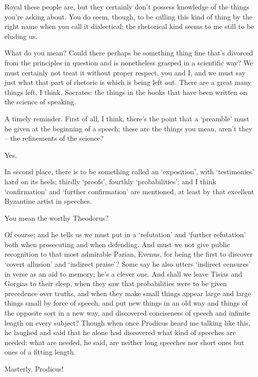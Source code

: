 Royal these people
are, but they certainly
don't possess knowledge of the things you're asking about. You do seem,
though, to be calling this kind of thing by the right name when you call
it dialectical; the rhetorical kind seems to me still to be eluding
us.

What do you mean? Could there perhaps be something 
thing fine that's divorced from the principles in question and is
nonetheless grasped in a scientific way? We must certainly not treat it
without proper respect, you and I, and we must say just what that part
of rhetoric is which is being left out. There are a great many
things left, I think, Socrates:  the things in the books that
have been written on the science of speaking.

A timely reminder. First of all, I think, there's the point
that a ‘preamble' must be given at the beginning of a speech; these are
the things you mean, aren't they -- the refinements of the science?

Yes. 

In second place, there is to be something called an
‘exposition', with ‘testimonies' hard on its heels; thirdly ‘proofs',
fourthly ‘probabilities'; and I think ‘confirmation' and ‘further
confirmation' are mentioned, at least by that excellent 
Byzantine artist in speeches.

You mean the worthy
Theodorus?

 Of course; and he tells us we must put in a
‘refutation' and ‘further refutation' both when prosecuting and when
defending. And must we not give public recognition to that most
admirable Parian, Evenus, for being the first to discover ‘covert
allusion' and ‘indirect praise'? Some say he also  utters
‘indirect censures' in verse as an aid to memory; he's a clever one. And
shall we leave Tisias and Gorgias to their sleep, when they saw that
probabilities were to be given precedence over truths, and when they
make small things appear large and  large things small by
force of speech, and put
new things in an old way and things of the opposite sort in a new way,
and discovered conciseness of speech and infinite length on every
subject? Though when once Prodicus heard me talking like this, he
laughed and said that he alone had discovered what kind of speeches are
needed: what are needed, he said, are neither long  speeches nor
short ones but ones of a fitting length.

Masterly, Prodicus!

